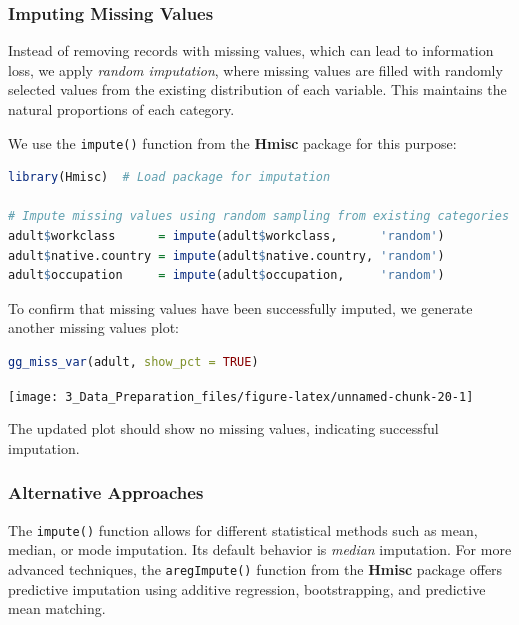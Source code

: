 \documentclass[
  11pt,
]{book}
\newcommand{\passthrough}[1]{#1}
\theoremstyle{definition}
\theoremstyle{definition}
\theoremstyle{definition}
\theoremstyle{definition}
\theoremstyle{remark}
\begin{document}
\subsubsection*{Imputing Missing Values}\label{imputing-missing-values}


Instead of removing records with missing values, which can lead to information loss, we apply \emph{random imputation}, where missing values are filled with randomly selected values from the existing distribution of each variable. This maintains the natural proportions of each category.

We use the \passthrough{\lstinline!impute()!} function from the \textbf{Hmisc} package for this purpose:

\begin{lstlisting}[language=R]
library(Hmisc)  # Load package for imputation

# Impute missing values using random sampling from existing categories
adult$workclass      = impute(adult$workclass,      'random')
adult$native.country = impute(adult$native.country, 'random')
adult$occupation     = impute(adult$occupation,     'random')
\end{lstlisting}

To confirm that missing values have been successfully imputed, we generate another missing values plot:

\begin{lstlisting}[language=R]
gg_miss_var(adult, show_pct = TRUE)
\end{lstlisting}

\begin{center}\texttt{[image: 3\_Data\_Preparation\_files/figure-latex/unnamed-chunk-20-1]} \end{center}

The updated plot should show no missing values, indicating successful imputation.

\subsubsection*{Alternative Approaches}\label{alternative-approaches}


The \passthrough{\lstinline!impute()!} function allows for different statistical methods such as mean, median, or mode imputation. Its default behavior is \emph{median} imputation. For more advanced techniques, the \passthrough{\lstinline!aregImpute()!} function from the \textbf{Hmisc} package offers predictive imputation using additive regression, bootstrapping, and predictive mean matching.
\end{document}
